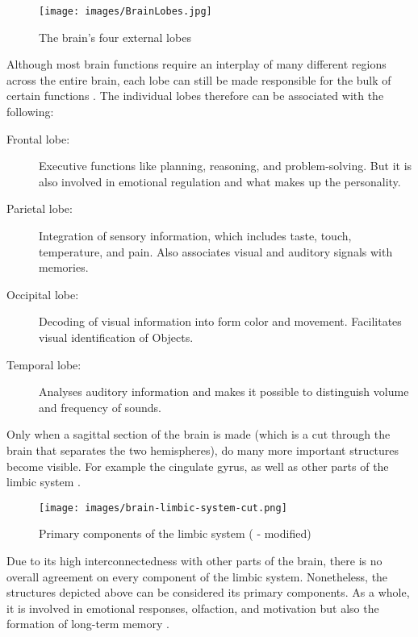     \begin{figure}[H]
        \centering
        \texttt{[image: images/BrainLobes.jpg]}
        \caption{The brain's four external lobes \cite{LobesOfBrain}}
        \label{fig:external-lobes}
    \end{figure}

    Although most brain functions require an interplay of many different regions across the entire brain, each lobe can still be made responsible for the bulk of certain functions \cite{LobesOfBrain}. The individual lobes therefore can be associated with the following:
    \begin{description}
    \item[Frontal lobe:] Executive functions like planning, reasoning, and problem-solving. But it is also involved in emotional regulation and what makes up the personality.
    \item[Parietal lobe:] Integration of sensory information, which includes taste, touch, temperature, and pain. Also associates visual and auditory signals with memories.
    \item[Occipital lobe:] Decoding of visual information into form color and movement. Facilitates visual identification of Objects.
    \item[Temporal lobe:] Analyses auditory information and makes it possible to distinguish volume and frequency of sounds.
    \cite{thebrain-SimpleToComplex-neuroAnatomy-b}
    \end{description} 
    
    
    Only when a sagittal section of the brain is made (which is a cut through the brain that separates the two hemispheres), do many more important structures become visible. For example the cingulate gyrus, as well as other parts of the limbic system \cite{thebrain-SimpleToComplex-neuroAnatomy-i}.
    
    \begin{figure}[H]
        \centering
        \texttt{[image: images/brain-limbic-system-cut.png]}
        \caption{Primary components of the limbic system (\cite{LimbicSystem} - modified)}
        \label{fig:limbic-system}
    \end{figure}

    Due to its high interconnectedness with other parts of the brain, there is no overall agreement on every component of the limbic system. Nonetheless, the structures depicted above can be considered its primary components. As a whole, it is involved in emotional responses, olfaction, and motivation but also the formation of long-term memory \cite{LimbicSystem}.

